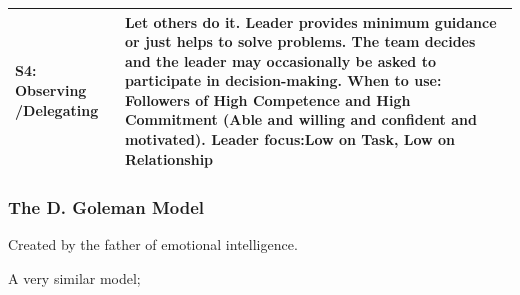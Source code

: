 \documentclass[]{project_plan}
\begin{document}
\begin{tabular}{|p{30mm}|p{115mm}|}
  \hline
  S4: Observing /Delegating       & Let others do it. Leader provides minimum guidance or just helps to solve problems. The team decides and the leader may occasionally be asked to participate in decision-making. \newline When to use: Followers of High Competence and High Commitment (Able and willing and confident and motivated). \newline Leader focus:Low on Task, Low on Relationship                                                                                                                                          \\
  \hline
\end{tabular}

\newpage

\subsubsection{The D. Goleman Model}

Created by the father of emotional intelligence.

A very similar model;
\end{document}
